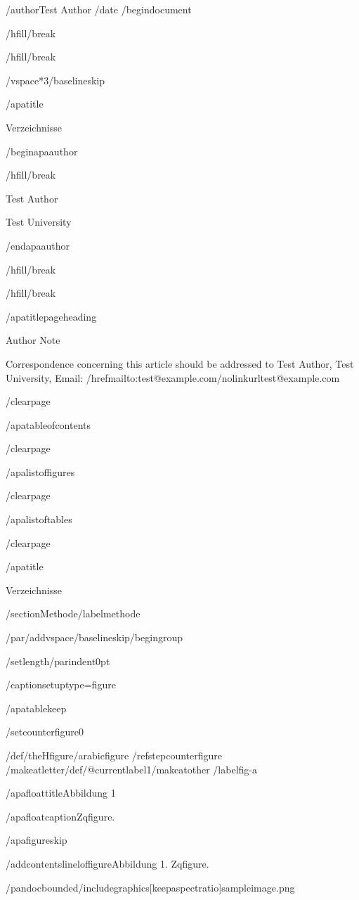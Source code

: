 /author{Test Author}
/date{}
/begin{document}


/hfill/break

/hfill/break

/vspace*{3/baselineskip}

/apatitle{

Verzeichnisse

}

/begin{apaauthor}

/hfill/break

Test Author

Test University

/end{apaauthor}

/hfill/break

/hfill/break

/apatitlepageheading{

Author Note

}

Correspondence concerning this article should be addressed to Test
Author, Test University, Email:
/href{mailto:test@example.com}{/nolinkurl{test@example.com}}

/clearpage

/apatableofcontents

/clearpage

/apalistoffigures

/clearpage

/apalistoftables

/clearpage

/apatitle{

Verzeichnisse

}

/section{Methode}/label{methode}

/par/addvspace{/baselineskip}/begingroup

/setlength{/parindent}{0pt}

/captionsetup{type=figure}

/apatablekeep

/setcounter{figure}{0}

/def/theHfigure{/arabic{figure}}%
/refstepcounter{figure}%
/makeatletter/def/@currentlabel{1}/makeatother%
/label{fig-a}

/apafloattitle{Abbildung 1}

/apafloatcaption{Zqfigure.}

/apafigureskip

/addcontentsline{lof}{figure}{Abbildung 1. Zqfigure.}

/pandocbounded{/includegraphics[keepaspectratio]{sampleimage.png}}

